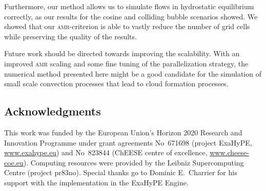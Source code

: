\documentclass[runningheads]{llncs}
\newcommand{\amr}{\textsc{amr}}
\newcommand{\softwareName}[1]{#1}
\newcommand{\exahypeengine}{\softwareName{ExaHyPE Engine}}
\begin{document}
Furthermore, our method allows us to simulate flows in hydrostatic equilibrium correctly, as our results for the cosine and colliding bubble scenarios showed.
We showed that our \amr{}-criterion is able to vastly reduce the number of grid cells while preserving the quality of the results.

Future work should be directed towards improving the scalability.
With an improved \amr{} scaling and some fine tuning of the parallelization strategy, the numerical method presented here might be a good candidate for the simulation of small scale convection processes that lead to cloud formation processes.

\subsection*{Acknowledgments}
This work was funded by the European Union’s Horizon 2020 Research and Innovation Programme under grant agreements 
No~671698 (project ExaHyPE, \url{www.exahype.eu}) and 
No~823844 (ChEESE centre of excellence, \url{www.cheese-coe.eu}).
Computing resources were provided by the Leibniz Supercomputing Centre (project pr83no).
Special thanks go to Dominic E.\ Charrier for his support with the implementation in the \exahypeengine{}.


{}
\end{document}
